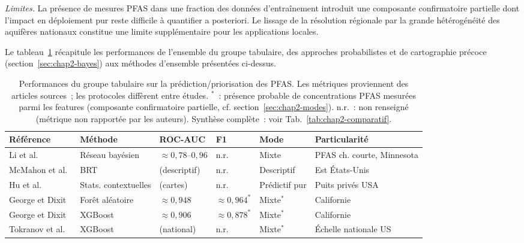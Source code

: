 \emph{Limites.}
La pr\'esence de mesures PFAS dans une fraction des donn\'ees d'entra\^inement introduit une composante confirmatoire partielle dont l'impact en d\'eploiement pur reste difficile \`a quantifier a posteriori.
Le lissage de la r\'esolution r\'egionale par la grande h\'et\'erog\'en\'eit\'e des aquif\`eres nationaux constitue une limite suppl\'ementaire pour les applications locales.

Le tableau~\ref{tab:chap2-ensemble-perf} r\'ecapitule les performances de l'ensemble du groupe tabulaire, des approches probabilistes et de cartographie pr\'ecoce (section~\ref{sec:chap2-bayes}) aux m\'ethodes d'ensemble pr\'esent\'ees ci-dessus.

\begin{table}[h!]
    \centering
    \caption{Performances du groupe tabulaire sur la pr\'ediction/priorisation des PFAS. Les m\'etriques proviennent des articles sources~; les protocoles diff\`erent entre \'etudes. $^{*}$~: pr\'esence probable de concentrations PFAS mesur\'ees parmi les features (composante confirmatoire partielle, cf. section~\ref{sec:chap2-modes}). n.r.~: non renseign\'e (m\'etrique non rapport\'ee par les auteurs). Synth\`ese compl\`ete~: voir Tab.~\ref{tab:chap2-comparatif}.}
    \label{tab:chap2-ensemble-perf}
    \small
    \begin{tabular}{lp{2.5cm}p{1.5cm}p{1.4cm}p{1.7cm}p{2.2cm}}
        \hline
        R\'ef\'erence & M\'ethode & ROC-AUC & F1 & Mode & Particularit\'e \\
        \hline
        Li et al.~\cite{li2022pfas} & R\'eseau bay\'esien & $\approx 0{,}78$--$0{,}96$ & n.r. & Mixte & PFAS ch. courte, Minnesota \\
        McMahon et al.~\cite{mcmahon2022pfas} & BRT & (descriptif) & n.r. & Descriptif & Est \'Etats-Unis \\
        Hu et al.~\cite{hu2021privatewells} & Stats. contextuelles & (cartes) & n.r. & Pr\'edictif pur & Puits priv\'es USA \\
        George et Dixit~\cite{george2021pfas} & For\^et al\'eatoire & $\approx 0{,}948$ & $\approx 0{,}964^{*}$ & Mixte$^{*}$ & Californie \\
        George et Dixit~\cite{george2021pfas} & XGBoost & $\approx 0{,}906$ & $\approx 0{,}878^{*}$ & Mixte$^{*}$ & Californie \\
        Tokranov et al.~\cite{tokranov2024pfas} & XGBoost & (national) & n.r. & Mixte$^{*}$ & \'Echelle nationale US \\
        \hline
    \end{tabular}
\end{table}

